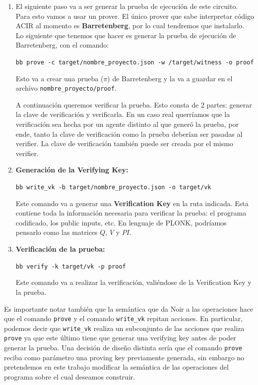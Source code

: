 \documentclass[11pt,a4paper]{tesis}
\begin{document}
\begin{enumerate}[start=6]
	\item El siguiente paso va a ser generar la prueba de ejecución de este circuito. Para esto vamos a usar un prover. El único prover que sabe interpretar código ACIR al momento es \textbf{Barretenberg}, por lo cual tendremos que instalarlo. Lo siguiente que tenemos que hacer es generar la prueba de ejecución de Barretenberg, con el comando:
	
	\vspace{0.5em}
	
	\texttt{bb prove -c target/nombre\_proyecto.json -w /target/witness -o proof}
	
	\vspace{0.5em}
	
	Esto va a crear una prueba ($\pi$) de Barretenberg y la va a guardar en el archivo \texttt{nombre\_proyecto/proof}.
	
	A continuación queremos verificar la prueba. Esto consta de 2 partes: generar la clave de verificación y verificarla. En un caso real querríamos que la verificación sea hecha por un agente distinto al que generó la prueba, por ende, tanto la clave de verificación como la prueba deberían ser pasadas al verifier. La clave de verificación también puede ser creada por el mismo verifier. 
	
	\item \textbf{Generación de la Verifying Key:}
	
	\vspace{0.5em}
	\texttt{bb write\_vk -b target/nombre\_proyecto.json -o target/vk}
	
	Este comando va a generar una \textbf{Verification Key} en la ruta indicada. Esta contiene toda la información necesaria para verificar la prueba: el programa codificado, los public inputs, etc. En lenguaje de PLONK, podríamos pensarlo como las matrices $Q$, $V$ y $PI$. 
	
	\item \textbf{Verificación de la prueba:}
	
	\texttt{bb verify -k target/vk -p proof}
	\vspace{0.5em}
	
	Este comando va a realizar la verificación, valiéndose de la Verification Key y la prueba.
	 
\end{enumerate}

Es importante notar también que la semántica que da Noir a las operaciones hace que el comando \texttt{prove} y el comando \texttt{write\_vk} repitan acciones. En particular, podemos decir que \texttt{write\_vk} realiza un subconjunto de las acciones que realiza \texttt{prove} ya que este último tiene que generar una verifying key antes de poder generar la prueba. Una decisión de diseño distinta sería que el comando \texttt{prove} reciba como parámetro una proving key previamente generada, sin embargo no pretendemos en este trabajo modificar la semántica de las operaciones del programa sobre el cual deseamos construir. 
\end{document}
